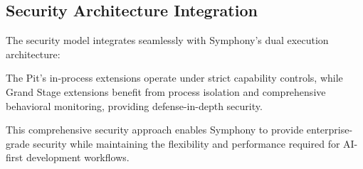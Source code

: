 \subsection*{Security Architecture Integration}

The security model integrates seamlessly with Symphony's dual execution architecture:

\begin{alertbox}
The Pit's in-process extensions operate under strict capability controls, while Grand Stage extensions benefit from process isolation and comprehensive behavioral monitoring, providing defense-in-depth security.
\end{alertbox}

This comprehensive security approach enables Symphony to provide enterprise-grade security while maintaining the flexibility and performance required for AI-first development workflows.